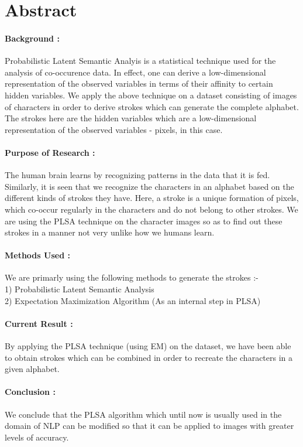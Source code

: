 \documentclass[10pt]{article}
\begin{document}
	\section{Abstract}
		\paragraph{Background :}
		Probabilistic Latent Semantic Analyis is a statistical technique used for the analysis of co-occurence data. In effect, one can derive a low-dimensional representation of the observed variables in terms of their affinity to certain hidden variables. We apply the above technique on a dataset consisting of images of characters in order to derive strokes which can generate the complete alphabet. The strokes here are the hidden variables which are a low-dimensional representation of the observed variables - pixels, in this case.
		\paragraph{Purpose of Research :}
		The human brain learns by recognizing patterns in the data that it is fed. Similarly, it is seen that we recognize the characters in an alphabet based on the different kinds of strokes they have. Here, a stroke is a unique formation of pixels, which co-occur regularly in the characters and do not belong to other strokes. We are using the PLSA technique on the character images so as to find out these strokes in a manner not very unlike how we humans learn.
		\paragraph{Methods Used :}
		We are primarly using the following methods to generate the strokes :- \\
		1) Probabilistic Latent Semantic Analysis\\2) Expectation Maximization Algorithm (As an internal step in PLSA)	
		\paragraph{Current Result :}
		By applying the PLSA technique (using EM) on the dataset, we have been able to obtain strokes which can be combined in order to recreate the characters in a given alphabet.
		\paragraph{Conclusion :}
		We conclude that the PLSA algorithm which until now is usually used in the domain of NLP can be modified so that it can be applied to images with greater levels of accuracy.
	\newpage
\end{document}
